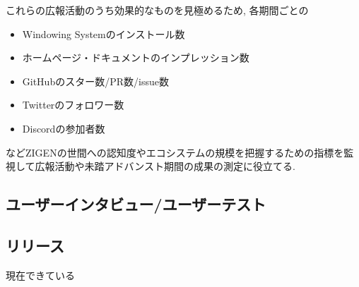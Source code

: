 これらの広報活動のうち効果的なものを見極めるため, 各期間ごとの
\begin{itemize}
  \item Windowing Systemのインストール数
  \item ホームページ・ドキュメントのインプレッション数
  \item GitHubのスター数/PR数/issue数
  \item Twitterのフォロワー数
  \item Discordの参加者数
\end{itemize}
などZIGENの世間への認知度やエコシステムの規模を把握するための指標を監視して広報活動や未踏アドバンスト期間の成果の測定に役立てる.

\subsection{ユーザーインタビュー/ユーザーテスト}

\subsection{リリース}
現在できている
